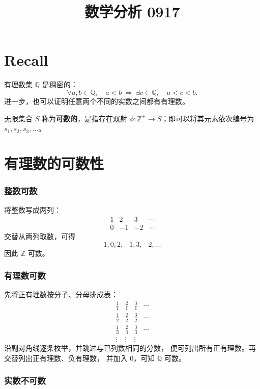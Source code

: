 \documentclass[UTF8,11pt]{ctexart}
\title{数学分析 0917}
\date{}
\theoremstyle{cnthm}
\begin{document}
\maketitle

\section{Recall}

有理数集 $\mathbb Q$ 是稠密的：
\[
\forall a,b\in\mathbb Q,\quad
a<b\ \Longrightarrow\
\exists c\in\mathbb Q,\quad a<c<b.
\]
进一步，也可以证明任意两个不同的实数之间都有有理数。

无限集合 $S$ 称为\textbf{可数的}，是指存在双射
$\phi:\mathbb Z^+\to S$；即可以将其元素依次编号为
$s_1,s_2,s_3,\ldots$。

\section{有理数的可数性}

\subsubsection*{整数可数}

将整数写成两列：
\[
\begin{array}{cccc}
1&2&3&\cdots\\
0&-1&-2&\cdots
\end{array}
\]
交替从两列取数，可得
\[
1,0,2,-1,3,-2,\ldots
\]
因此 $\mathbb Z$ 可数。

\subsubsection*{有理数可数}

先将正有理数按分子、分母排成表：
\[
\begin{array}{cccc}
\frac11&\frac21&\frac31&\cdots\\[2pt]
\frac12&\frac22&\frac32&\cdots\\[2pt]
\frac13&\frac23&\frac33&\cdots\\
\vdots&\vdots&\vdots&
\end{array}
\]
沿副对角线逐条枚举，并跳过与已列数相同的分数，
便可列出所有正有理数。再交替列出正有理数、负有理数，
并加入 $0$，可知 $\mathbb Q$ 可数。

\subsubsection*{实数不可数}
\end{document}
